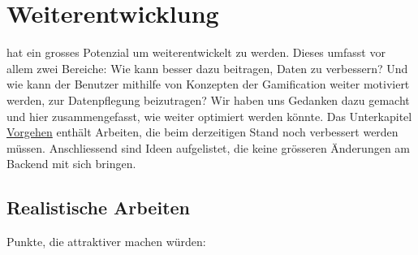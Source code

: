 \chapter{Weiterentwicklung}
\label{pd-weiterentwicklung}

\kort{} hat ein grosses Potenzial um weiterentwickelt zu werden.
Dieses umfasst vor allem zwei Bereiche:
Wie kann \kort{} besser dazu beitragen,  Daten zu verbessern?
Und wie kann der Benutzer mithilfe von Konzepten der Gamification weiter motiviert werden, zur Datenpflegung beizutragen?\newline
Wir haben uns Gedanken dazu gemacht und hier zusammengefasst, wie \kort{} weiter optimiert werden könnte.
Das Unterkapitel \hyperref[pd-weiterentwicklung-vorgehen]{Vorgehen} enthält Arbeiten, die beim derzeitigen Stand noch verbessert werden müssen. 
Anschliessend sind Ideen aufgelistet, die keine grösseren Änderungen am Backend mit sich bringen.


\section{Realistische Arbeiten}
\label{pd-weiterentwicklung-realistisch}
Punkte, die \kort{} attraktiver machen würden:

